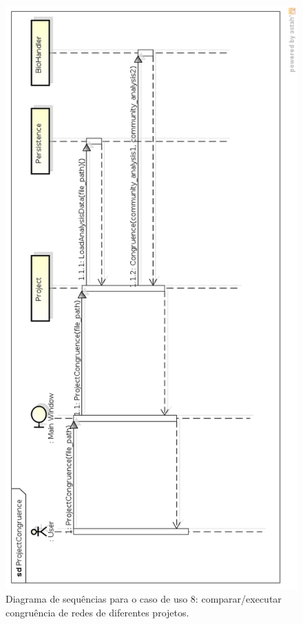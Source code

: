 \begin{figure}
\centering
\includegraphics[scale=0.47]{project-congruence}
\caption{Diagrama de sequências para o caso de uso 8: comparar/executar congruência de redes de diferentes projetos.}
\label{fig:project-congruence}
\end{figure}

